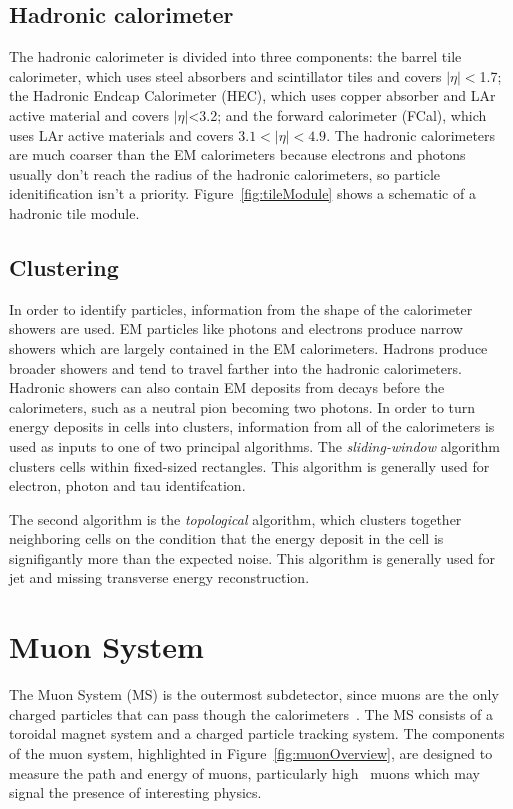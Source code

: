 \subsection{Hadronic calorimeter}
The hadronic calorimeter is divided into three components: the barrel tile calorimeter, which uses steel absorbers and scintillator tiles and covers $|\eta| <$1.7; the Hadronic Endcap Calorimeter (HEC), which uses copper absorber and LAr active material and covers $|\eta|$<3.2; and the forward calorimeter (FCal), which uses LAr active materials and covers $3.1 < |\eta| < 4.9$. The hadronic calorimeters are much coarser than the EM calorimeters because electrons and photons usually don't reach the radius of the hadronic calorimeters, so particle idenitification isn't a priority. Figure~\ref{fig:tileModule} shows a schematic of a hadronic tile module.

\subsection{Clustering}
\label{ss:cluster}
In order to identify particles, information from the shape of the calorimeter showers are used. EM particles like photons and electrons produce narrow showers which are largely contained in the EM calorimeters. Hadrons produce broader showers and tend to travel farther into the hadronic calorimeters. Hadronic showers can also contain EM deposits from decays before the calorimeters, such as a neutral pion becoming two photons. In order to turn energy deposits in cells into clusters, information from all of the calorimeters is used as inputs to one of two principal algorithms\cite{ATL-LARG-PUB-2008-002}. The \emph{sliding-window} algorithm clusters cells within fixed-sized rectangles. This algorithm is generally used for electron, photon and tau identifcation. 

The second algorithm is the \emph{topological} algorithm, which clusters together neighboring cells on the condition that the energy deposit in the cell is signifigantly more than the expected noise. This algorithm is generally used for jet and missing transverse energy reconstruction.

\section{Muon System}
The Muon System (MS) is the outermost subdetector, since muons are the only charged particles that can pass though the calorimeters~\cite{2010.muonspectrometer}. The MS consists of a toroidal magnet system and a charged particle tracking system. The components of the muon system, highlighted in Figure~\ref{fig:muonOverview}, are designed to measure the path and energy of muons, particularly high \pt\ muons which may signal the presence of interesting physics.

